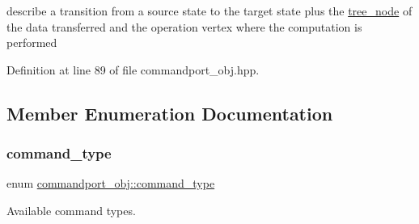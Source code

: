 describe a transition from a source state to the target state plus the \hyperlink{classtree__node}{tree\+\_\+node} of the data transferred and the operation vertex where the computation is performed 



Definition at line 89 of file commandport\+\_\+obj.\+hpp.



\subsection{Member Enumeration Documentation}
\mbox{\label{classcommandport__obj_a2aacc9b2d5176f992066e7d499a5322e}} 
\subsubsection{\texorpdfstring{command\+\_\+type}{command\_type}}
{\footnotesize\ttfamily enum \hyperlink{classcommandport__obj_a2aacc9b2d5176f992066e7d499a5322e}{commandport\+\_\+obj\+::command\+\_\+type}}



Available command types. 

